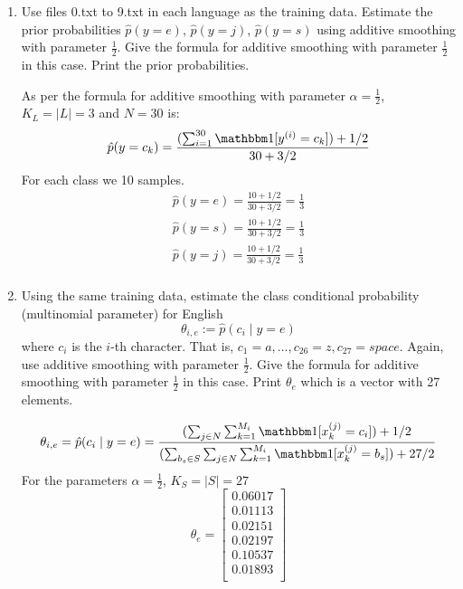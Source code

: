 \documentclass[a4paper]{article}
\theoremstyle{definition}
\def\ind{\mathbbm 1}
\newenvironment{soln}{
    \leavevmode\color{blue}\ignorespaces
}{}
\begin{document}
\begin{enumerate}
\item
Use files 0.txt to 9.txt in each language as the training data.
Estimate the prior probabilities 
$\hat p(y=e)$,
$\hat p(y=j)$,
$\hat p(y=s)$
using additive smoothing with parameter $\frac{1}{2}$. 
Give the formula for additive smoothing with parameter $\frac{1}{2}$ in this case. 
Print the prior probabilities.
\\
\begin{soln}
As per the formula for additive smoothing with parameter $\alpha=\frac{1}{2}$, $K_L=|L|=3$ and $N=30$ is:
    $$
    \hat{p}(y = c_k) = \frac{(\sum_{i = 1}^{30}\ind [y^{(i)} = c_k]) + 1/2}{30 + 3/2}
    $$  
For each class we 10 samples.
    \begin{align*}
        \hat{p}(y = e) = \frac{10 + 1/2}{30 + 3/2} = \frac{1}{3} \\
        \hat{p}(y = s) = \frac{10 + 1/2}{30 + 3/2} = \frac{1}{3} \\
        \hat{p}(y = j) = \frac{10 + 1/2}{30 + 3/2} = \frac{1}{3} \\
    \end{align*}
\end{soln}
\item
Using the same training data, estimate the class conditional probability (multinomial parameter) for English
$$\theta_{i,e} := \hat p(c_i \mid y=e)$$ 
where $c_i$ is the $i$-th character. That is, $c_1 = a, \ldots, c_{26} = z, c_{27} = space$.
Again, use additive smoothing with parameter $\frac{1}{2}$.
Give the formula for additive smoothing with parameter $\frac{1}{2}$ in this case. 
Print $\theta_e$ which is a vector with 27 elements.
\begin{soln}
$$
    \theta_{i,e} = \hat p(c_i \mid y=e) = \frac{(\sum_{j\in N}\sum_{k = 1}^{M_i}\ind [x_{k}^{(j)} = c_i]) + 1/2}{(\sum_{b_s \in S}\sum_{j\in N}\sum_{k = 1}^{M_i}\ind [x_{k}^{(j)} = b_s]) + 27/2}\\
    $$
    For the parameters $\alpha=\frac{1}{2}$,  $K_S=|S|=27$ 
    $$\theta_e =   \begin{bmatrix}
                            0.06017 \\
                            0.01113 \\
                            0.02151 \\
                            0.02197 \\
                            0.10537 \\
                            0.01893 \\

\end{bmatrix}$$
\end{soln}
\end{enumerate}
\end{document}
